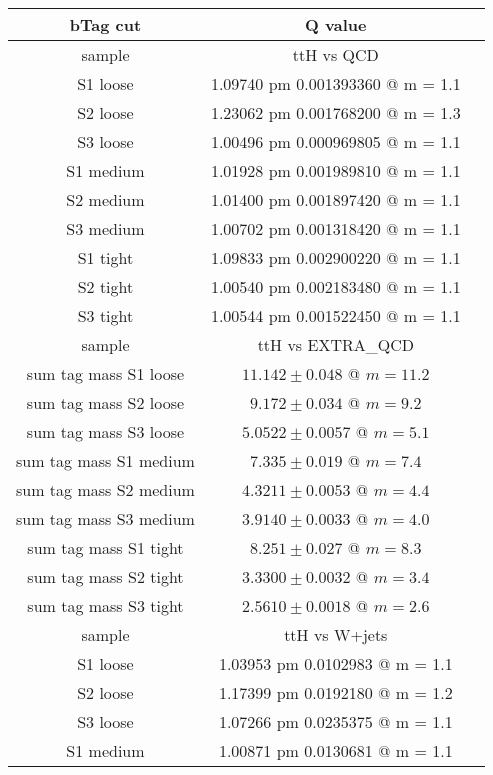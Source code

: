 \documentclass[12pt,a4paper,twoside,english]{report}
\begin{document}
\begin{table}[h!]
  \center
  \begin{tabular}{||c|c|c||}
    \hline
    \hline
    bTag cut & Q value \\
    \hline
    sample & ttH vs QCD\\
    \hline
    S1 loose  & 1.09740 pm 0.001393360 @ m = 1.1\\
    S2 loose  & 1.23062 pm 0.001768200 @ m = 1.3\\
    S3 loose  & 1.00496 pm 0.000969805 @ m = 1.1\\
    S1 medium & 1.01928 pm 0.001989810 @ m = 1.1\\
    S2 medium & 1.01400 pm 0.001897420 @ m = 1.1\\
    S3 medium & 1.00702 pm 0.001318420 @ m = 1.1\\
    S1 tight  & 1.09833 pm 0.002900220 @ m = 1.1\\
    S2 tight  & 1.00540 pm 0.002183480 @ m = 1.1\\
    S3 tight  & 1.00544 pm 0.001522450 @ m = 1.1\\
    \hline
    \hline
    sample & ttH vs EXTRA\_QCD\\
    \hline
    sum tag mass S1 loose  & $11.142 \pm 0.048 $ @ $m = 11.2$\\
    sum tag mass S2 loose  & $9.172  \pm 0.034 $ @ $m =  9.2$\\
    sum tag mass S3 loose  & $5.0522 \pm 0.0057$ @ $m =  5.1$\\
    sum tag mass S1 medium & $7.335  \pm 0.019 $ @ $m =  7.4$\\
    sum tag mass S2 medium & $4.3211 \pm 0.0053$ @ $m =  4.4$\\
    sum tag mass S3 medium & $3.9140 \pm 0.0033$ @ $m =  4.0$\\
    sum tag mass S1 tight  & $8.251  \pm 0.027 $ @ $m =  8.3$\\
    sum tag mass S2 tight  & $3.3300 \pm 0.0032$ @ $m =  3.4$\\
    sum tag mass S3 tight  & $2.5610 \pm 0.0018$ @ $m =  2.6$\\
    \hline
    \hline
    sample & ttH vs W+jets\\
    \hline
    S1 loose  & 1.03953 pm 0.0102983 @ m = 1.1\\
    S2 loose  & 1.17399 pm 0.0192180 @ m = 1.2\\ 
    S3 loose  & 1.07266 pm 0.0235375 @ m = 1.1\\
    S1 medium & 1.00871 pm 0.0130681 @ m = 1.1\\

\end{tabular}
\end{table}
\end{document}

